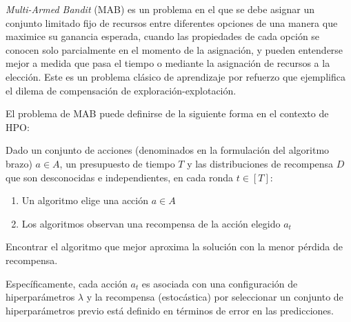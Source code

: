 \textit{Multi-Armed Bandit} (MAB) es un problema en el que se debe asignar un conjunto limitado fijo de recursos entre diferentes opciones de una manera que maximice su ganancia esperada, cuando las propiedades de cada opción se conocen solo parcialmente en el momento de la asignación, y pueden entenderse mejor a medida que pasa el tiempo o mediante la asignación de recursos a la elección. Este es un problema clásico de aprendizaje por refuerzo que ejemplifica el dilema de compensación de exploración-explotación.

El problema de MAB puede definirse de la siguiente forma en el contexto de HPO:

\begin{definition}

Dado un conjunto de acciones (denominados en la formulación del algoritmo brazo) $a \in A$, un presupuesto de tiempo $T$ y las distribuciones de recompensa $D$ que son desconocidas e independientes, en cada ronda $t \in [T]$:

\begin{enumerate}
	\item Un algoritmo elige una acción $a \in A$
	\item Los algoritmos observan una recompensa de la acción elegido $a_t$
\end{enumerate}

Encontrar el algoritmo que mejor aproxima la solución con la menor pérdida de recompensa.

\end{definition}

Específicamente, cada acción $a_t$ es asociada con una configuración de hiperparámetros $\lambda$ y la recompensa (estocástica) por seleccionar un conjunto de hiperparámetros previo está definido en términos de error en las predicciones.

